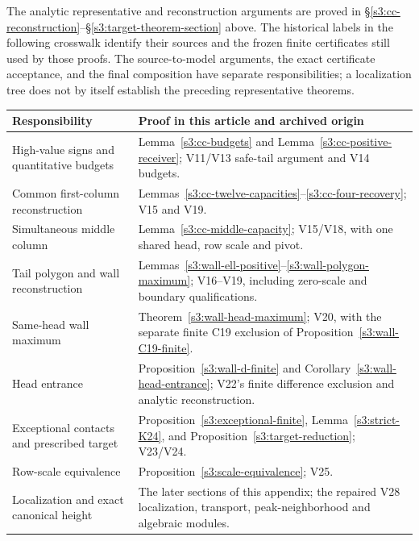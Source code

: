 \documentclass[11pt,reqno]{amsart}
\theoremstyle{definition}
\theoremstyle{remark}
\begin{document}
The analytic representative and reconstruction arguments are proved in
\S\ref{s3:cc-reconstruction}--\S\ref{s3:target-theorem-section} above.
The historical labels in the following crosswalk identify their sources
and the frozen finite certificates still used by those proofs. The
source-to-model arguments, the exact certificate acceptance, and the
final composition have separate responsibilities; a localization tree
does not by itself establish the preceding representative theorems.
\begin{center}
\small
\begin{tabular}{@{}>{\raggedright\arraybackslash}p{.34\linewidth}>{\raggedright\arraybackslash}p{.57\linewidth}@{}}
\toprule
Responsibility & Proof in this article and archived origin\\
\midrule
High-value signs and quantitative budgets &
 Lemma~\ref{s3:cc-budgets} and Lemma~\ref{s3:cc-positive-receiver};
 V11/V13 safe-tail argument and V14 budgets.\\
Common first-column reconstruction &
 Lemmas~\ref{s3:cc-twelve-capacities}--\ref{s3:cc-four-recovery};
 V15 and V19.\\
Simultaneous middle column &
 Lemma~\ref{s3:cc-middle-capacity}; V15/V18, with one shared
 head, row scale and pivot.\\
Tail polygon and wall reconstruction &
 Lemmas~\ref{s3:wall-ell-positive}--\ref{s3:wall-polygon-maximum};
 V16--V19, including zero-scale and boundary qualifications.\\
Same-head wall maximum &
 Theorem~\ref{s3:wall-head-maximum}; V20, with the separate
 finite C19 exclusion of Proposition~\ref{s3:wall-C19-finite}.\\
Head entrance &
 Proposition~\ref{s3:wall-d-finite} and Corollary~\ref{s3:wall-head-entrance};
 V22's finite difference exclusion and analytic reconstruction.\\
Exceptional contacts and prescribed target &
 Proposition~\ref{s3:exceptional-finite}, Lemma~\ref{s3:strict-K24},
 and Proposition~\ref{s3:target-reduction}; V23/V24.\\
Row-scale equivalence &
 Proposition~\ref{s3:scale-equivalence}; V25.\\
Localization and exact canonical height &
 The later sections of this appendix; the repaired V28 localization,
 transport, peak-neighborhood and algebraic modules.\\
\bottomrule
\end{tabular}
\end{center}
\end{document}
